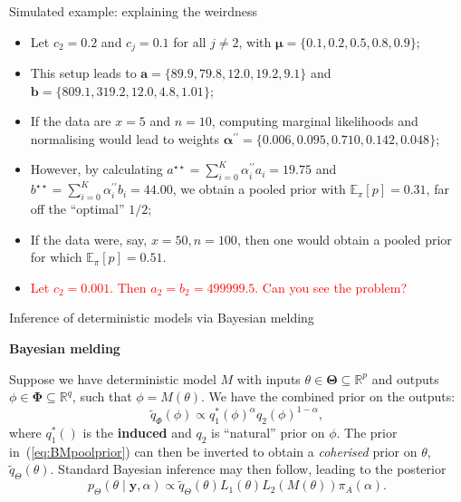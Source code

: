 \begin{frame}{Simulated example: explaining the weirdness}
\begin{itemize}
 \item Let $c_2 = 0.2$ and $c_j = 0.1$ for all $j \neq 2$, with $\boldsymbol\mu = \{0.1, 0.2, \mathbf{0.5}, 0.8, 0.9\}$;\pause
 \item This setup leads to $\boldsymbol a = \{ 89.9, 79.8, \mathbf{12.0}, 19.2, 9.1\}$ and $\boldsymbol b = \{809.1, 319.2, \mathbf{12.0}, 4.8, 1.01\} $;\pause
 \item If the data are $x = 5$ and $n = 10$, computing marginal likelihoods and normalising would lead to weights $\boldsymbol\alpha^{\prime\prime} = \{0.006, 0.095, \mathbf{0.710}, 0.142, 0.048\}$;\pause
 \item However, by calculating $a^{\star\star} = \sum_{i = 0}^K \alpha_i^{\prime\prime} a_i = 19.75$ and $b^{\star\star} =  \sum_{i = 0}^K \alpha_i^{\prime\prime} b_i = 44.00$, we obtain a pooled prior with $\mathbb{E}_\pi [p] =  0.31$, far off the ``optimal'' $1/2$;\pause
 \item If the data were, say, $x = 50, n = 100$, then one would obtain a pooled prior for which $\mathbb{E}_\pi [p] = 0.51$.\pause
 \item [\textcolor{red}{\textbullet}] \textcolor{red}{Let $c_2 = 0.001$. Then $a_2 = b_2 = 499999.5$. Can you see the problem?}
\end{itemize}
\end{frame}
\begin{frame}{Inference of deterministic models via Bayesian melding}
\begin{center}
\textbf{Bayesian melding} 
\end{center}
Suppose we have deterministic model $M$ with inputs $\theta \in \boldsymbol\Theta \subseteq \mathbb{R}^p$ and outputs $\phi \in \boldsymbol\Phi\subseteq \mathbb{R}^q$, such that $\phi = M(\theta)$.
We have the combined prior on the outputs:
\begin{equation}
 \label{eq:BMpoolprior}
 \tilde{q}_{\Phi}(\phi) \propto q_1^\ast(\phi)^\alpha q_2(\phi)^{1-\alpha},
\end{equation}
where $q_1^\ast()$ is the \textbf{induced} and $q_2$ is ``natural'' prior on $\phi$.
The prior in~(\ref{eq:BMpoolprior}) can then be inverted to obtain a \textit{coherised} prior on $\theta$, $\tilde{q}_{\Theta}(\theta)$.
Standard Bayesian inference may then follow,  leading to the posterior
\begin{equation}
 \label{eq:BMpoolposterior}
 p_{\Theta}(\theta \mid \boldsymbol y, \alpha) \propto \tilde{q}_{\Theta}(\theta) L_1(\theta) L_2(M(\theta))\pi_A(\alpha).
\end{equation}
\end{frame}

